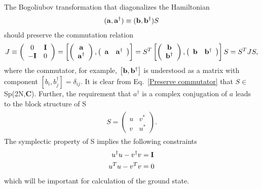 The Bogoliubov transformation that diagonalizes the Hamiltonian
\begin{eqnarray}\begin{aligned}
\label{Def. of a}
({\bf a} , {\bf a}^\dagger)\equiv({\bf b} , {\bf b}^\dagger)S
\end{aligned}\end{eqnarray}
should preserve the commutation relation
\begin{eqnarray}\begin{aligned}
\label{Preserve commutator}
J\equiv\left(\begin{array}{ccc}
0 & {\bf I}\\
-{\bf I} & 0
\end{array}\right)
=\left[
\left(\begin{array}{ccc}
{\bf a} \\
{\bf a}^\dagger
\end{array}\right),
\left(\begin{array}{ccc}
{\bf a} & {\bf a}^\dagger
\end{array}\right)\right]
=S^T\left[
\left(\begin{array}{ccc}
{\bf b} \\
{\bf b}^\dagger
\end{array}\right),
\left(\begin{array}{ccc}
{\bf b} & {\bf b}^\dagger
\end{array}\right)\right]S
=S^T JS,
\end{aligned}\end{eqnarray}
where the commutator, for example, $\left[{\bf b},{\bf b}^\dagger\right]$ is understood as a matrix with component $[b_i,b_j^\dagger]=\delta_{ij}$. It is clear from Eq.~\eqref{Preserve commutator} that $S\in$Sp(2N,{\bf C})\cite{fulton_representation_2004}. Further, the requirement that $a^\dagger$ is a complex conjugation of $a$ leads to the block structure of S
\begin{eqnarray}\begin{aligned}
\label{Block of S}
S=\left(\begin{array}{ccc}
u & v^*\\
v & u^*
\end{array}\right).
\end{aligned}\end{eqnarray}
The symplectic property of S implies the following constraints 
\begin{eqnarray}
u^\dagger u-v^\dagger v&={\bf I}\label{Constraint 1}\\
u^T u-v^T v&=0\label{Constraint 2}
\end{eqnarray}
which will be important for calculation of the ground state. 

